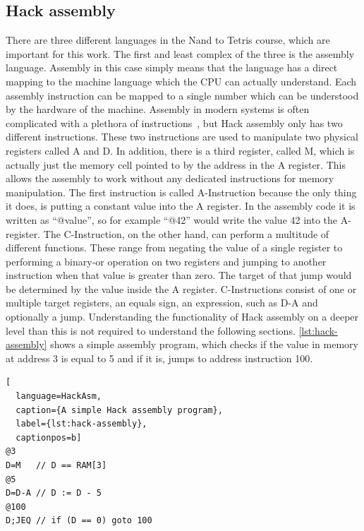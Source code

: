 \subsection{Hack assembly} \label{hack-assembly}
There are three different languages in the Nand to Tetris course, which are important for this work.
The first and least complex of the three is the assembly language.
Assembly in this case simply means that the language has a direct mapping to the machine language which the CPU can actually understand.
Each assembly instruction can be mapped to a single number which can be understood by the hardware of the machine.
Assembly in modern systems is often complicated with a plethora of instructions~\cite{guide2011intel}, but Hack assembly only has two different instructions.
These two instructions are used to manipulate two physical registers called A and D.
In addition, there is a third register, called M, which is actually just the memory cell pointed to by the address in the A register.
This allows the assembly to work without any dedicated instructions for memory manipulation.
The first instruction is called A-Instruction because the only thing it does, is putting a constant value into the A register.
In the assembly code it is written as ``@value'', so for example ``@42'' would write the value 42 into the A-register.
The C-Instruction, on the other hand, can perform a multitude of different functions.
These range from negating the value of a single register to performing a binary-or operation on two registers and jumping to another instruction when that value is greater than zero.
The target of that jump would be determined by the value inside the A register.
C-Instructions consist of one or multiple target registers, an equals sign, an expression, such as D-A and optionally a jump.
Understanding the functionality of Hack assembly on a deeper level than this is not required to understand the following sections.
\cref{lst:hack-assembly} shows a simple assembly program, which checks if the value in memory at address 3 is equal to 5 and if it is, jumps to address instruction 100.

\begin{lstlisting}[
  language=HackAsm,
  caption={A simple Hack assembly program},
  label={lst:hack-assembly},
  captionpos=b]
@3
D=M   // D == RAM[3]
@5
D=D-A // D := D - 5
@100
D;JEQ // if (D == 0) goto 100
\end{lstlisting}


